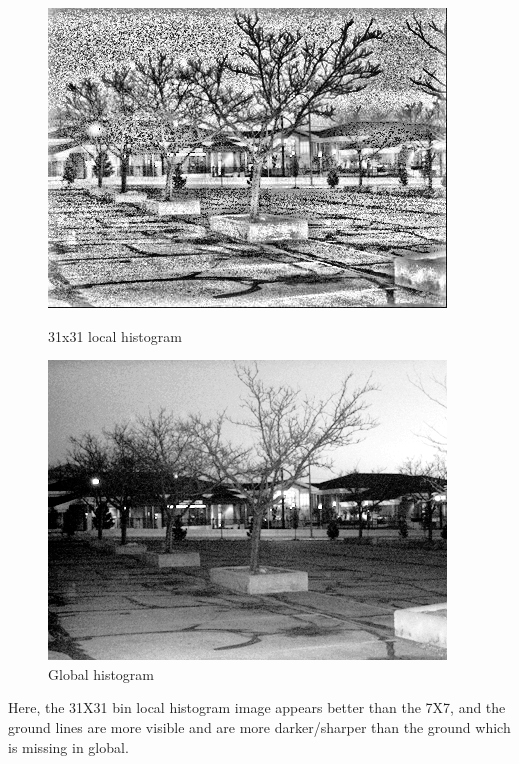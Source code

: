 \documentclass{article}
\begin{document}
\begin{figure}[!htb]
    \centering
    \begin{minipage}[b]{0.45\textwidth}
        \includegraphics[width=\textwidth]{LC1_local_31.jpg}
        \caption{31x31 local histogram}
    \end{minipage}
    \begin{minipage}[b]{0.45\textwidth}
        \includegraphics[width=\textwidth]{LC1_global.png}
        \caption{Global histogram}
    \end{minipage}
\end{figure}

Here, the 31X31 bin local histogram image appears better than the 7X7, and the ground lines are more visible and are more darker/sharper than the ground which is missing in global.
\end{document}
